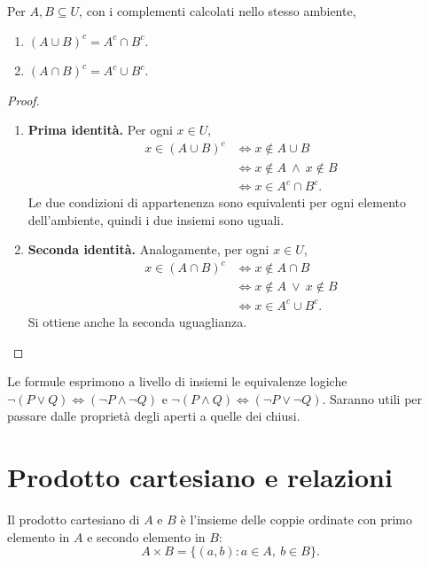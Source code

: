 \begin{proposizione}
Per $A,B\subseteq U$, con i complementi calcolati nello stesso ambiente,
\begin{enumerate}[label=\arabic*.]
\item $(A\cup B)^c=A^c\cap B^c$.
\item $(A\cap B)^c=A^c\cup B^c$.
\end{enumerate}
\end{proposizione}
\enlargethispage{\baselineskip}
\begin{proof}
\begin{enumerate}[label=\arabic*.]
\item \textbf{Prima identità.} Per ogni $x\in U$,
\[
  \begin{aligned}
    x\in(A\cup B)^c
    &\iff x\notin A\cup B\\
    &\iff x\notin A\ \land\ x\notin B\\
    &\iff x\in A^c\cap B^c.
  \end{aligned}
\]
Le due condizioni di appartenenza sono equivalenti per ogni elemento dell'ambiente, quindi i due insiemi sono uguali.
\item \textbf{Seconda identità.} Analogamente, per ogni $x\in U$,
\[
  \begin{aligned}
    x\in(A\cap B)^c
    &\iff x\notin A\cap B\\
    &\iff x\notin A\ \lor\ x\notin B\\
    &\iff x\in A^c\cup B^c.
  \end{aligned}
\]
Si ottiene anche la seconda uguaglianza.
\end{enumerate}
\end{proof}

Le formule esprimono a livello di insiemi le equivalenze logiche $\neg(P\lor Q)\Leftrightarrow(\neg P\land\neg Q)$ e $\neg(P\land Q)\Leftrightarrow(\neg P\lor\neg Q)$. Saranno utili per passare dalle proprietà degli aperti a quelle dei chiusi.

\section{Prodotto cartesiano e relazioni}

\begin{definizione}
Il prodotto cartesiano di $A$ e $B$ è l'insieme delle coppie ordinate con primo elemento in $A$ e secondo elemento in $B$:
\[
  A\times B=\{(a,b):a\in A,\ b\in B\}.
\]
\end{definizione}

